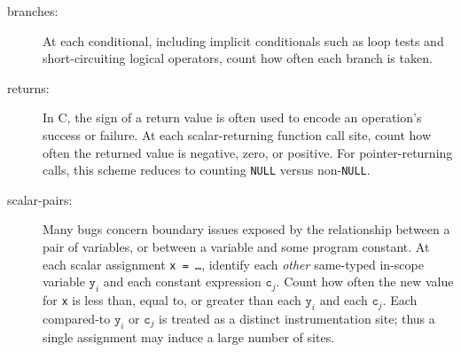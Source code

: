 \documentclass[10pt]{acmconfbig}
\begin{document}
\begin{description}
\sloppy
\item[branches:] At each conditional, including implicit conditionals
such as loop tests and short-circuiting logical operators,
  count how often each branch is taken.  

\item[returns:] In C, the
  sign of a return value is often used to encode an operation's success or failure.
  At each scalar-returning function call site, count how
  often the returned value is negative, zero, or positive.  For
  pointer-returning calls, this scheme reduces to counting
  \texttt{NULL} versus non-\texttt{NULL}.  

\item[scalar-pairs:] Many bugs
  concern boundary issues exposed by the relationship between a pair
  of variables, or between a variable and some program constant.  At
  each scalar assignment \texttt{x = \dots}, identify each
  \emph{other} same-typed in-scope variable $\mathtt{y}_i$ and each
  constant expression $\mathtt{c}_j$.  Count how often the new value
  for \texttt{x} is less than, equal to, or greater than each
  $\mathtt{y}_i$ and each $\mathtt{c}_j$.  
Each compared-to $\mathtt{y}_i$
  or $\mathtt{c}_j$ is treated as a distinct instrumentation site;
  thus a single assignment may induce a large number of sites.  
\end{description}
\end{document}
